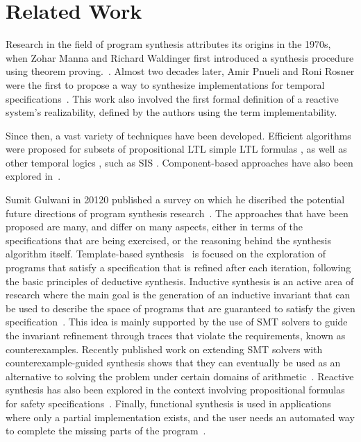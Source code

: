 \section{Related Work}

Research in the field of program synthesis attributes its origins in the 1970s,
when Zohar Manna and Richard Waldinger first introduced a synthesis procedure
using theorem proving.~\cite{manna1971toward}. Almost two decades later, Amir
Pnueli and Roni Rosner were the first to propose a way to synthesize
implementations for temporal specifications~\cite{Pnueli89}. This work also
involved the first formal definition of a reactive system's realizability,
defined by the authors using the term implementability.

Since then, a vast variety of techniques have been developed. Efficient
algorithms were proposed for subsets of propositional LTL
\cite{Klein10,tomita2016safraless,ehlers2010symbolic,cheng2016structural} simple
LTL formulas \cite{Bohy12,hagihara2016simple,Tini03}, as well as other temporal
logics \cite{benevs2012factorization,monmege2016real,Hamza10}, such as SIS \cite{Aziz95}.
Component-based approaches have also been explored in~\cite{Chatterjee07,dammyou}.

Sumit Gulwani in 20120  published a survey on which he discribed the
potential future directions of program synthesis research~\cite{gulwani2010dimensions}.
The approaches that have been proposed are many, and differ on many aspects,
either in terms of the specifications that are being exercised, or the reasoning
behind the synthesis algorithm itself. Template-based
synthesis~\cite{srivastava2013template} is focused on the exploration of
programs that satisfy a specification that is refined after each
iteration, following the basic principles of deductive synthesis. Inductive
synthesis is an active area of research where the main goal
is the generation of an inductive invariant that can be used to describe the
space of programs that are guaranteed to satisfy the given
specification~\cite{flener2001inductive}.
This idea is mainly supported by the use of SMT solvers to guide the invariant
refinement through traces that violate the requirements, known as
counterexamples. Recently published work on extending SMT solvers with
counterexample-guided synthesis shows that they can eventually be
used as an alternative to solving the problem under certain domains of
arithmetic~\cite{reynoldscounterexample}. Reactive synthesis has also
been explored in the context involving propositional formulas for safety
specifications~\cite{bloem2016satisfiability}. Finally, functional synthesis is
used in applications where only a partial implementation exists, and the user needs an automated way to complete the missing parts of the program~\cite{kneuss2013integrating}.


